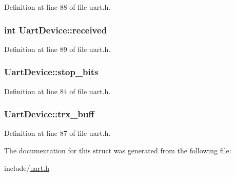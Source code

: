 Definition at line 88 of file uart.\-h.

\hypertarget{structUartDevice_af8973705d358fe7d10ab6f3c1382a035}{
\subsubsection[{received}]{\setlength{\rightskip}{0pt plus 5cm}int Uart\-Device\-::received}}\label{structUartDevice_af8973705d358fe7d10ab6f3c1382a035}


Definition at line 89 of file uart.\-h.

\hypertarget{structUartDevice_a4c196eb55ccaa09061a843bbe47d29dc}{
\subsubsection[{stop\-\_\-bits}]{ Uart\-Device\-::stop\-\_\-bits}}\label{structUartDevice_a4c196eb55ccaa09061a843bbe47d29dc}


Definition at line 84 of file uart.\-h.

\hypertarget{structUartDevice_ab83762d1f1257fbbc3ba728520fa0231}{
\subsubsection[{trx\-\_\-buff}]{ Uart\-Device\-::trx\-\_\-buff}}\label{structUartDevice_ab83762d1f1257fbbc3ba728520fa0231}


Definition at line 87 of file uart.\-h.



The documentation for this struct was generated from the following file\-:\begin{DoxyCompactItemize}
\item 
include/\hyperlink{uart_8h}{uart.\-h}\end{DoxyCompactItemize}
